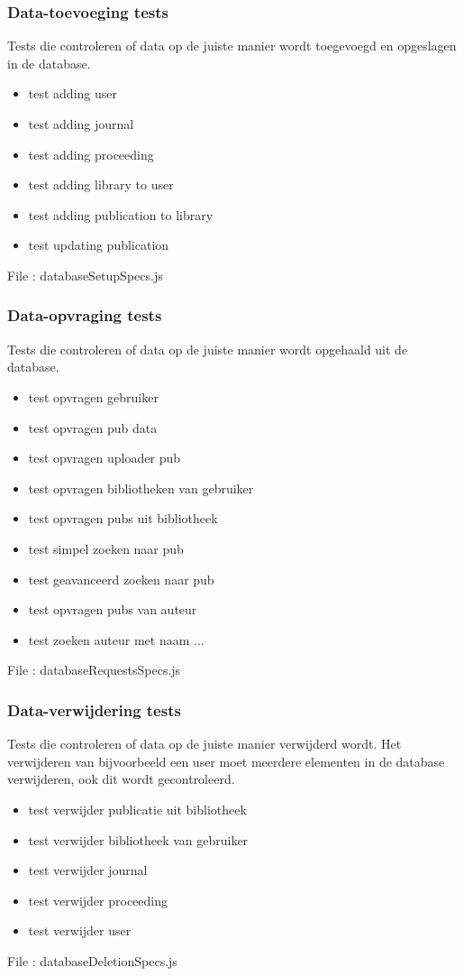 \documentclass{article}
\begin{document}
\subsubsection{Data-toevoeging tests}
Tests die controleren of data op de juiste manier wordt toegevoegd en opgeslagen in de database.
\begin{itemize}
\item test adding user
\item test adding journal 
\item test adding proceeding
\item test adding library to user
\item test adding publication to library
\item test updating publication
\end{itemize}
File : databaseSetupSpecs.js
\subsubsection{Data-opvraging tests}
Tests die controleren of data op de juiste manier wordt opgehaald uit de database.
\begin{itemize}
\item test opvragen gebruiker
\item test opvragen pub data
\item test opvragen uploader pub
\item test opvragen bibliotheken van gebruiker
\item test opvragen pubs uit bibliotheek
\item test simpel zoeken naar pub
\item test geavanceerd zoeken naar pub
\item test opvragen pubs van auteur
\item test zoeken auteur met naam ...
\end{itemize}
File : databaseRequestsSpecs.js
\subsubsection{Data-verwijdering tests}
Tests die controleren of data op de juiste manier verwijderd wordt. Het verwijderen van bijvoorbeeld een user moet meerdere elementen in de database verwijderen, ook dit wordt gecontroleerd. 
\begin{itemize}
\item test verwijder publicatie uit bibliotheek
\item test verwijder bibliotheek van gebruiker
\item test verwijder journal
\item test verwijder proceeding
\item test verwijder user
\end{itemize}
File : databaseDeletionSpecs.js
\end{document}
